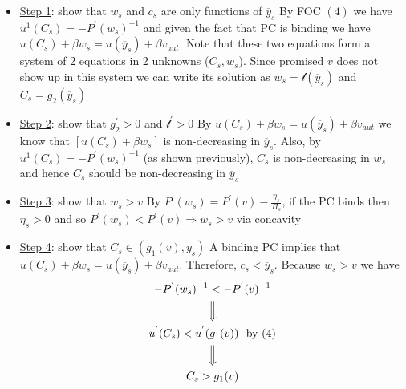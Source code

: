 \documentclass{article}
\begin{document}
\begin{itemize}
\begin{itemize}
\begin{itemize}
            \begin{itemize}
                \item \underline{Step 1}: show that $w_{s}$ and $c_{s}$ are only functions of $\overline{y}_{s}$
                \newline
                By FOC $(4)$ we have $u^{1} (C_{s}) = -P^{'}(w_{s})^{-1}$ and given the fact that PC is binding we have $u(C_{s}) + \beta w_{s} = u(\overline{y}_{s}) + \beta v_{aut}$. Note that these two equations form a system of 2 equations in 2 unknowns ($C_{s}, w_{s}$). Since promised $v$ does not show up in this system we can write its solution as $w_{s} = \mathcal{l}(\overline{y}_{s})$ and $C_{s} = g_{2}(\overline{y}_{s})$
                \item  \underline{Step 2}: show that $g_{2}^{'} > 0$ and $\mathcal{l}^{'} > 0$
                \newline
                By $u(C_{s}) + \beta w_{s} = u(\overline{y}_{s}) + \beta v_{aut}$ we know that $[u(C_{s}) + \beta w_{s}]$ is non-decreasing in $\overline{y}_{s}$. Also, by $u^{1} (C_{s}) = -P^{'}(w_{s})^{-1}$ (as shown previously), $C_{s}$ is non-decreasing in $w_{s}$ and hence $C_{s}$ should be non-decreasing in $\overline{y}_{s}$
                \item  \underline{Step 3}: show that $w_{s} > v$
                \newline
                By $P^{'}(w_{s}) = P^{'}(v) - \tfrac{\eta_{s}}{\Pi_{s}}$, if the PC binds then $\eta_{s} > 0$ and so $P^{'}(w_{s}) < P^{'}(v) \Rightarrow w_{s} > v$ via concavity
                \item  \underline{Step 4}: show that $C_{s} \in (g_{1}(v), \overline{y}_{s})$
                \newline
                A binding PC implies that $u(C_{s}) + \beta w_{s} = u(\overline{y}_{s}) + \beta v_{aut}$. Therefore, $c_{s} < \overline{y}_{s}$. Because $w_{s} > v$ we have
                \begin{gather*}
                    -P^{'}(w_{s})^{-1} < -P^{'}(v)^{-1} \\
                    \Big\Downarrow \\
                    u^{'}(C_{s}) < u^{'}(g_{1}(v)) \ \ \text{by (4)} \\
                    \Big\Downarrow \\
                    C_{s} > g_{1}(v)
                \end{gather*}
            \end{itemize}
        \end{itemize}

\end{itemize}
\end{itemize}
\end{document}
